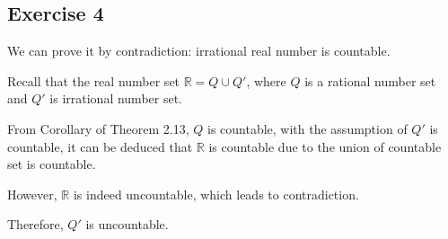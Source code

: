 \subsection*{Exercise 4}
We can prove it by contradiction: irrational real number is countable.

Recall that the real number set $\mathbb{R} = Q \cup Q'$, where $Q$ is a rational number set and $Q'$ is irrational number set.

From Corollary of Theorem 2.13, $Q$ is countable, with the assumption of $Q'$ is countable, it can be deduced that $\mathbb{R}$ is countable due to the union of countable set is countable.

However, $\mathbb{R}$ is indeed uncountable, which leads to contradiction.

Therefore, $Q'$ is uncountable.

